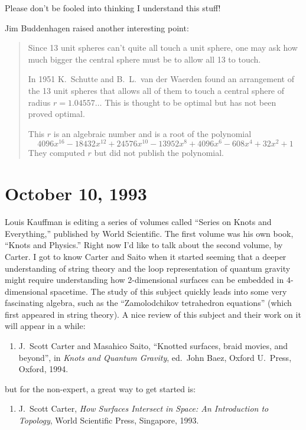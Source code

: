 \documentclass{article}
\def\tightlist{}
\begin{document}
Please don't be fooled into thinking I understand this stuff!

Jim Buddenhagen raised another interesting point:

\begin{quote}
Since 13 unit spheres can't quite all touch a unit sphere, one may ask
how much bigger the central sphere must be to allow all 13 to touch.

In 1951 K.\ Schutte and B.\ L.\ van der Waerden found an arrangement of the
13 unit spheres that allows all of them to touch a central sphere of
radius \(r=1.04557\ldots\) This is thought to be optimal but has not
been proved optimal.

This \(r\) is an algebraic number and is a root of the polynomial
\[4096 x^{16} -18432 x^{12} +24576 x^{10} -13952 x^8 +4096 x^6 -608x^4 +32 x^2 +1\]
They computed \(r\) but did not publish the polynomial.
\end{quote}


\hypertarget{week21}{%
\section{October 10, 1993}\label{week21}}

Louis Kauffman is editing a series of volumes called ``Series on Knots
and Everything,'' published by World Scientific. The first volume was
his own book, ``Knots and Physics.'' Right now I'd like to talk about
the second volume, by Carter. I got to know Carter and Saito when it
started seeming that a deeper understanding of string theory and the
loop representation of quantum gravity might require understanding how
2-dimensional surfaces can be embedded in \(4\)-dimensional spacetime.
The study of this subject quickly leads into some very fascinating
algebra, such as the ``Zamolodchikov tetrahedron equations'' (which
first appeared in string theory). A nice review of this subject and
their work on it will appear in a while:

\begin{enumerate}
\def\labelenumi{\arabic{enumi})}
\tightlist
\item
 J.\ Scott Carter and Masahico Saito,  ``Knotted surfaces, braid movies, and beyond'', in \emph{Knots and Quantum Gravity}, ed.~John
  Baez, Oxford U.\ Press, Oxford, 1994.
\end{enumerate}
\noindent
but for the non-expert, a great way to get started is:

\begin{enumerate}
\def\labelenumi{\arabic{enumi})}
\setcounter{enumi}{1}
\tightlist
\item
  J.\ Scott Carter, \emph{How Surfaces Intersect in Space: An Introduction to Topology},
   World Scientific Press, Singapore, 1993.
\end{enumerate}
\end{document}
